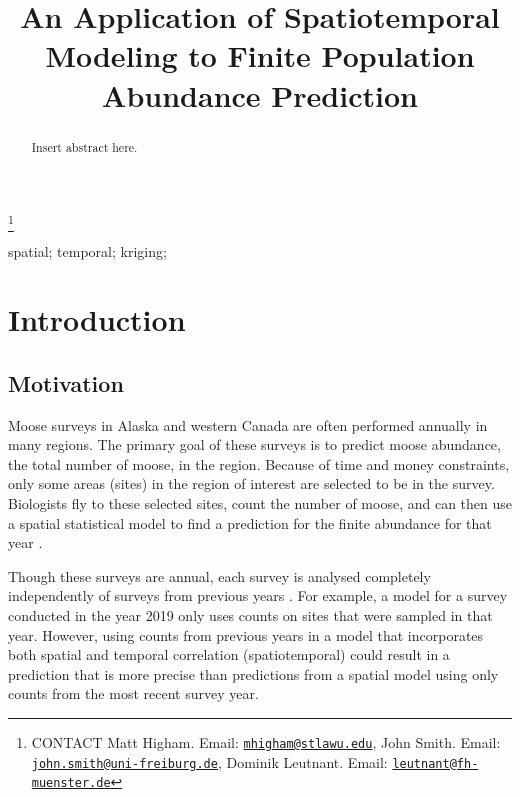 \documentclass[]{interact}
\theoremstyle{plain}%
\theoremstyle{definition}
\theoremstyle{remark}
\begin{document}

\title{An Application of Spatiotemporal Modeling to Finite Population
Abundance Prediction}


\author{
}

\thanks{CONTACT Matt
Higham. Email: \href{mailto:mhigham@stlawu.edu}{\nolinkurl{mhigham@stlawu.edu}}, John
Smith. Email: \href{mailto:john.smith@uni-freiburg.de}{\nolinkurl{john.smith@uni-freiburg.de}}, Dominik
Leutnant. Email: \href{mailto:leutnant@fh-muenster.de}{\nolinkurl{leutnant@fh-muenster.de}}}

\maketitle

\begin{abstract}
Insert abstract here.
\end{abstract}

\begin{keywords}
spatial; temporal; kriging;
\end{keywords}

\section{Introduction}

\subsection{Motivation}

Moose surveys in Alaska and western Canada are often performed annually
in many regions. The primary goal of these surveys is to predict moose
abundance, the total number of moose, in the region. Because of time and
money constraints, only some areas (sites) in the region of interest are
selected to be in the survey. Biologists fly to these selected sites,
count the number of moose, and can then use a spatial statistical model
to find a prediction for the finite abundance for that year
\citep{ver2008spatial}.

Though these surveys are annual, each survey is analysed completely
independently of surveys from previous years
\citep[e.g.][]{gasaway1986estimating, kellie_geospatial_2006, boertje2009managing, peters2014contrasting}.
For example, a model for a survey conducted in the year 2019 only uses
counts on sites that were sampled in that year. However, using counts
from previous years in a model that incorporates both spatial and
temporal correlation (spatiotemporal) could result in a prediction that
is more precise than predictions from a spatial model using only counts
from the most recent survey year.
\end{document}
